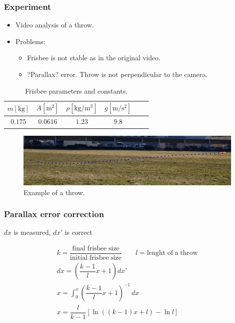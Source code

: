 \documentclass{beamer}
\begin{document}

\begin{frame}

\frametitle{Experiment}

\begin{itemize}
\item Video analysis of a throw.
\item Problems:
\begin{itemize}
\item Frisbee is not stable as in the original video.
\item ?Parallax? error. Throw is not perpendicular to the camera.
\end{itemize}
\end{itemize}

\begin{table}
\begin{tabular}{|c|c|c|c|c|c|}
\hline 
$m [\mathrm{kg}]$ & $A [\mathrm{m^2}]$ & $\rho [\mathrm{kg/m^3}]$ &  $g [\mathrm{m / s^2}]$ \\ 
\hline 
$0.175$ & $0.0616$ & $1.23$ & $9.8$ \\ 
\hline 
\end{tabular}
\caption{Frisbee parameters and constants.}
\end{table} 

\begin{figure}[H]
	\centering
	  \includegraphics[width=\textwidth]{primer_meta.png}
	  \caption{Example of a throw.}
\end{figure}

\end{frame}


\begin{frame}

\frametitle{Parallax error correction}

\(dx\) is measured, \(dx'\) is correct

\begin{gather}
k = \dfrac{\mathrm{final \; frisbee \; size}}{\mathrm{initial \;  frisbee  \; size}} \qquad l = \mathrm{lenght \; of \; a \; throw}\\
dx = \left( \dfrac{k - 1}{l} x + 1 \right) dx' \\
x = \int_{0}^{x} \left( \dfrac{k - 1}{l} x + 1 \right)^{-1} \,dx \\
x = \dfrac{l}{k - 1} \left[ \ln((k - 1) x + l) - \ln l \right]
\end{gather}

\end{frame}
\end{document}

